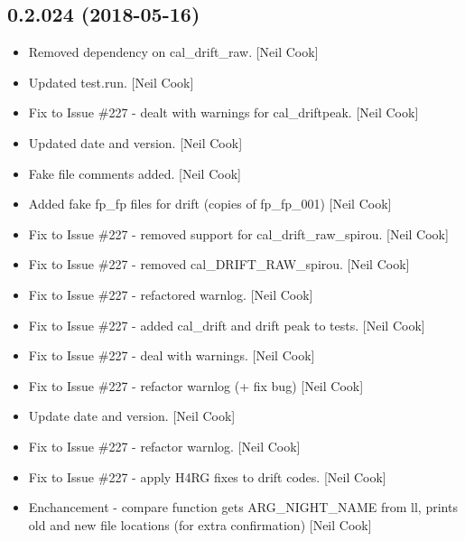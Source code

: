 \documentclass[a4paper,10pt,english]{report}
\begin{document}
\subsection{0.2.024 (2018-05-16)}
\label{\detokenize{misc/changelog:id435}}\begin{itemize}
\item {} 
Removed dependency on cal\_drift\_raw. {[}Neil Cook{]}

\item {} 
Updated test.run. {[}Neil Cook{]}

\item {} 
Fix to Issue \#227 - dealt with warnings for cal\_driftpeak. {[}Neil Cook{]}

\item {} 
Updated date and version. {[}Neil Cook{]}

\item {} 
Fake file comments added. {[}Neil Cook{]}

\item {} 
Added fake fp\_fp files for drift (copies of fp\_fp\_001) {[}Neil Cook{]}

\item {} 
Fix to Issue \#227 - removed support for cal\_drift\_raw\_spirou. {[}Neil
Cook{]}

\item {} 
Fix to Issue \#227 - removed cal\_DRIFT\_RAW\_spirou. {[}Neil Cook{]}

\item {} 
Fix to Issue \#227 - refactored warnlog. {[}Neil Cook{]}

\item {} 
Fix to Issue \#227 - added cal\_drift and drift peak to tests. {[}Neil
Cook{]}

\item {} 
Fix to Issue \#227 - deal with warnings. {[}Neil Cook{]}

\item {} 
Fix to Issue \#227 - refactor warnlog (+ fix bug) {[}Neil Cook{]}

\item {} 
Update date and version. {[}Neil Cook{]}

\item {} 
Fix to Issue \#227 - refactor warnlog. {[}Neil Cook{]}

\item {} 
Fix to Issue \#227 - apply H4RG fixes to drift codes. {[}Neil Cook{]}

\item {} 
Enchancement - compare function gets ARG\_NIGHT\_NAME from ll, prints
old and new file locations (for extra confirmation) {[}Neil Cook{]}


\end{itemize}
\end{document}
